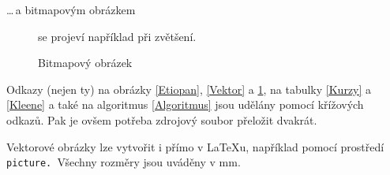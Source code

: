 \documentclass[a4paper, 11pt]{article}
\begin{document}
\noindent \ldots\,a bitmapovým obrázkem
\begin{figure}[ht]
\begin{center}
    \caption{Bitmapový obrázek}
    \label{Bitmap}
\end{center}
se projeví například při zvětšení.
\end{figure} 
\par Odkazy (nejen ty) na obrázky \ref{Etiopan}, \ref{Vektor} a \ref{Bitmap}, na tabulky \ref{Kurzy} a \ref{Kleene} a také na algoritmus \ref{Algoritmus} jsou udělány pomocí křížových odkazů. Pak je ovšem potřeba zdrojový soubor přeložit dvakrát.
\par Vektorové obrázky lze vytvořit i přímo v \LaTeX u, například pomocí prostředí\texttt{ picture. }Všechny rozměry jsou uváděny v mm.
\newpage
\end{document}
